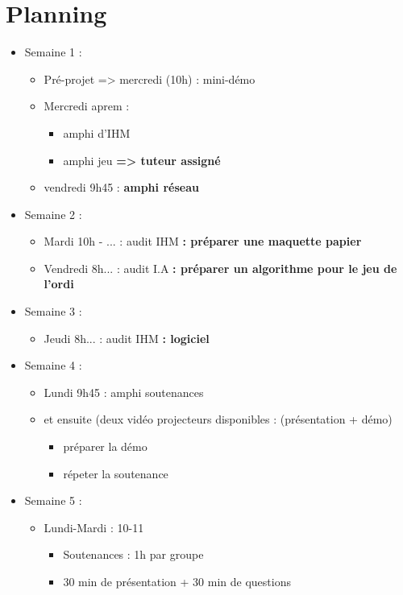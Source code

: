 \documentclass{article}
\begin{document}
\section{Planning}
\begin{itemize}
\item Semaine 1 :
  \begin{itemize}
  \item Pré-projet => mercredi (10h) : mini-démo
  \item Mercredi aprem : 
    \begin{itemize}
    \item amphi d'IHM
    \item amphi jeu \textbf{ => tuteur assigné}
    \end{itemize}
  \item vendredi 9h45 : \textbf{amphi réseau}
  \end{itemize}
\item Semaine 2 :
  \begin{itemize}
  \item Mardi 10h - ... : audit IHM \textbf{ : préparer une maquette papier}
  \item Vendredi 8h... : audit I.A \textbf{ : préparer un algorithme pour le jeu de l'ordi}
  \end{itemize}
\item Semaine 3 :
  \begin{itemize}
  \item Jeudi 8h... : audit IHM \textbf{ : logiciel}
  \end{itemize}
\item Semaine 4 :
  \begin{itemize}
  \item Lundi 9h45 : amphi soutenances 
  \item et ensuite (deux vidéo projecteurs disponibles : (présentation + démo)
    \begin{itemize}
    \item préparer la démo
    \item répeter la soutenance
    \end{itemize}
  \end{itemize}
\item Semaine 5 : 
  \begin{itemize}
  \item Lundi-Mardi : 10-11
    \begin{itemize}
    \item Soutenances : 1h par groupe
    \item 30 min de présentation + 30 min de questions
    \end{itemize}
  \end{itemize}
\end{itemize}
\newpage
\end{document}
